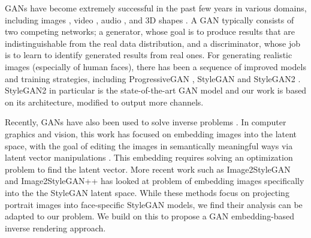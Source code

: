 GANs \cite{GAN} have become extremely successful in the past few years in various domains, including images \cite{DCGAN}, video \cite{Tulyakov18}, audio \cite{Donahue18}, and 3D shapes \cite{Li19}. A GAN typically consists of two competing networks; a generator, whose goal is to produce results that are indistinguishable from the real data distribution, and a discriminator, whose job is to learn to identify generated results from real ones. For generating realistic images (especially of human faces), there has been a sequence of improved models and training strategies, including ProgressiveGAN \cite{Karras2018}, StyleGAN \cite{StyleGAN} and StyleGAN2 \cite{StyleGAN2}. StyleGAN2 in particular is the state-of-the-art GAN model and our work is based on its architecture, modified to output more channels.

Recently, GANs have also been used to solve inverse problems \cite{Bora17,Asim19,Malley19}.
In computer graphics and vision, this work has focused on embedding images into the latent space, with the goal of editing the images in semantically meaningful ways via latent vector manipulations \cite{Zhu2016}. This embedding requires solving an optimization problem to find the latent vector.
More recent work such as Image2StyleGAN \cite{Abdal19a} and Image2StyleGAN++ \cite{Abdal19b} has looked at problem of embedding images specifically into the the StyleGAN latent space. While these methods focus on projecting portrait images into face-specific StyleGAN models, we find their analysis can be adapted to our problem.
We build on this to propose a GAN embedding-based inverse rendering approach.
